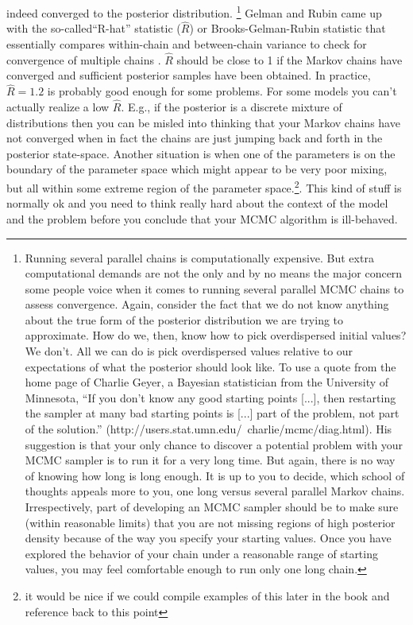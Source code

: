 indeed converged to the posterior distribution. \footnote{Running
  several parallel chains is computationally expensive. But extra
  computational demands are not the only and by no means the major
  concern some people voice when it comes to running several parallel
  MCMC chains to assess convergence. Again, consider the fact that we
  do not know anything about the true form of the posterior
  distribution we are trying to approximate. How do we, then, know how
  to pick overdispersed initial values? We don't. All we can do is
  pick overdispersed values relative to our expectations of what the
  posterior should look like. To use a quote from the home page of
  Charlie Geyer, a Bayesian statistician from the University of
  Minnesota, ``If you don't know any good starting points [...], then
  restarting the sampler at many bad starting points is [...] part of
  the problem, not part of the solution.''
  (http://users.stat.umn.edu/~charlie/mcmc/diag.html). His suggestion
  is that your only chance to discover a potential problem with your
  MCMC sampler is to run it for a very long time. But again, there is
  no way of knowing how long is long enough.  It is up to you to
  decide, which school of thoughts appeals more to you, one long
  versus several parallel Markov chains. Irrespectively, part of
  developing an MCMC sampler should be to make sure (within reasonable
  limits) that you are not missing regions of high posterior density
  because of the way you specify your starting values. Once you have
  explored the behavior of your chain under a reasonable range of
  starting values, you may feel comfortable enough to run only one
  long chain.} Gelman and Rubin came up with the so-called``R-hat''
statistic ($\hat{R}$) or Brooks-Gelman-Rubin statistic that
essentially compares within-chain and between-chain variance to check
for convergence of multiple chains \citep{gelman_etal:1996}. $\hat{R}$
should be close to 1 if the Markov chains have converged and
sufficient posterior samples have been obtained. In practice, $\hat{R}
= 1.2$ is probably good enough for some problems.  For some models you
can't actually realize a low $\hat{R}$. E.g., if the posterior is a
discrete mixture of distributions then you can be misled into thinking
that your Markov chains have not converged when in fact the chains are
just jumping back and forth in the posterior state-space.
Another situation is when one of the parameters is on the boundary of
the parameter space which might appear to be very poor mixing, but all
within some extreme region of the parameter space.\footnote{it would
  be nice if we could compile examples of this later in the book and
  reference back to this point}.
This
kind of stuff is normally ok and you need to think really hard about
the context of the model and the problem before you conclude that your
MCMC algorithm is ill-behaved.

